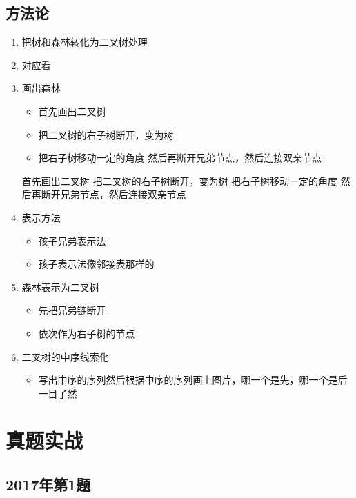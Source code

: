 \subsection{方法论}
\begin{enumerate}[noitemsep,topsep=0pt,parsep=0pt,partopsep=0pt]
\item 把树和森林转化为二叉树处理
\item 对应看
\item 画出森林
\begin{itemize}[noitemsep,topsep=0pt,parsep=0pt,partopsep=0pt]
\item 首先画出二叉树
\item 把二叉树的右子树断开，变为树
\item 把右子树移动一定的角度 然后再断开兄弟节点，然后连接双亲节点
\end{itemize}
	 首先画出二叉树
	 把二叉树的右子树断开，变为树
	 把右子树移动一定的角度 然后再断开兄弟节点，然后连接双亲节点
\item 表示方法
\begin{itemize}[noitemsep,topsep=0pt,parsep=0pt,partopsep=0pt]
	\item 孩子兄弟表示法
	\item 孩子表示法像邻接表那样的
\end{itemize}

\item 森林表示为二叉树
\begin{itemize}[noitemsep,topsep=0pt,parsep=0pt,partopsep=0pt]
	\item 先把兄弟链断开
	\item 依次作为右子树的节点
\end{itemize}

\item 二叉树的中序线索化
\begin{itemize}[noitemsep,topsep=0pt,parsep=0pt,partopsep=0pt]
	\item 写出中序的序列然后根据中序的序列画上图片，哪一个是先，哪一个是后一目了然
\end{itemize}

\end{enumerate}


\section{真题实战}


\subsection{2017年第1题}


